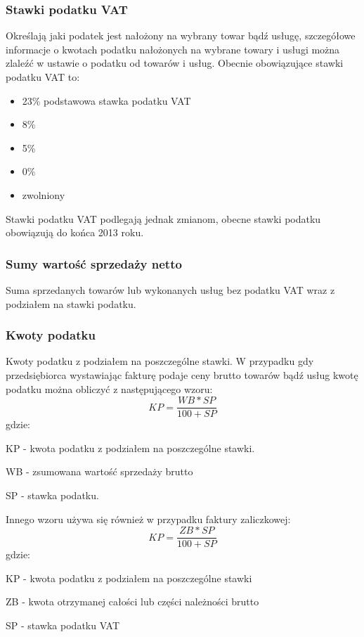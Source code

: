 \documentclass[12pt, a4paper]{article}
\begin{document}
\subsubsection{Stawki podatku VAT}
Określają jaki podatek jest nałożony na wybrany towar bądź usługę, szczegółowe
informacje o kwotach podatku nałożonych na wybrane towary i usługi można
zlaleźć w ustawie o podatku od towarów i usług\cite{etykieta1}. Obecnie
obowiązujące stawki podatku VAT to:
\begin{itemize}
  \item 23\% podstawowa stawka podatku VAT
  \item 8\%
  \item 5\%
  \item 0\%
  \item zwolniony
\end{itemize}
Stawki podatku VAT podlegają jednak zmianom, obecne stawki podatku obowiązują do
końca 2013 roku.
\subsubsection{Sumy wartość sprzedaży netto}
Suma sprzedanych towarów lub wykonanych usług bez podatku VAT wraz z podziałem
na stawki podatku.
\subsubsection{Kwoty podatku}
Kwoty podatku z podziałem na poszczególne stawki. W przypadku gdy przedsiębiorca
wystawiając fakturę podaje ceny brutto towarów bądź usług kwotę podatku można
obliczyć z następującego wzoru:
\begin{equation}
KP = \frac{WB * SP}{100 + SP}
\end{equation}
gdzie:

KP - kwota podatku z podziałem na poszczególne stawki.

WB - zsumowana wartość sprzedaży brutto

SP - stawka podatku.\newline


Innego wzoru używa się również w przypadku faktury zaliczkowej:
\begin{equation}
KP = \frac{ZB*SP}{100+SP}
\end{equation}
gdzie:

KP - kwota podatku z podziałem na poszczególne stawki

ZB - kwota otrzymanej całości lub części należności brutto

SP - stawka podatku VAT
\end{document}

